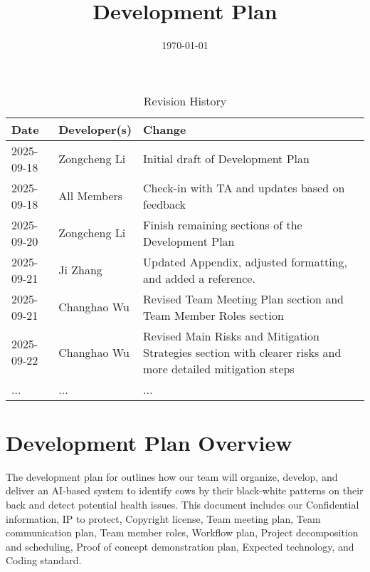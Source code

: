\documentclass{article}
\title{Development Plan\\\progname}
\author{\authname}
\date{\today}
\begin{document}
\maketitle

\begin{table}[hp]
\caption{Revision History} \label{TblRevisionHistory}
\begin{tabularx}{\textwidth}{llX}
\toprule
\textbf{Date} & \textbf{Developer(s)} & \textbf{Change}\\
\midrule
2025-09-18 & Zongcheng Li   & Initial draft of Development Plan \\
2025-09-18 & All Members    & Check-in with TA and updates based on feedback \\
2025-09-20 & Zongcheng Li   & Finish remaining sections of the Development Plan \\
2025-09-21 & Ji Zhang       & Updated Appendix, adjusted formatting, and added a reference.\\
2025-09-21 & Changhao Wu    & Revised Team Meeting Plan section and Team Member Roles section \\
2025-09-22 & Changhao Wu    & Revised Main Risks and Mitigation Strategies section with clearer risks and more detailed mitigation steps \\
... & ... & ...\\

\bottomrule
\end{tabularx}
\end{table}

\newpage{}


\section*{Development Plan Overview}
The development plan for \progname{} outlines how our team will organize, develop, 
and deliver an AI-based system to identify cows by their black-white patterns on their back 
and detect potential health issues. This document includes our Confidential information, 
IP to protect, Copyright license, Team meeting plan, Team communication plan, Team member 
roles, Workflow plan, Project decomposition and scheduling, Proof of concept demonstration 
plan, Expected technology, and Coding standard.

\end{document}
